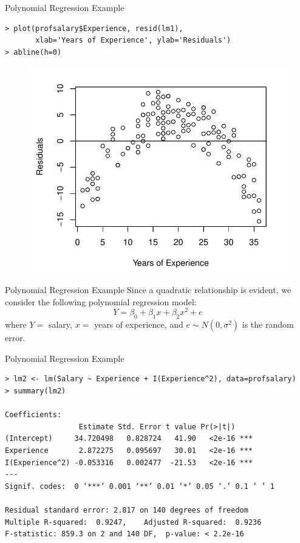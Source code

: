 \documentclass[10pt]{beamer}
\begin{document}
\begin{frame}[fragile]{Polynomial Regression Example}
\small
\begin{verbatim}
> plot(profsalary$Experience, resid(lm1), 
       xlab='Years of Experience', ylab='Residuals')
> abline(h=0)
\end{verbatim}
\begin{figure}
\includegraphics[scale=0.5]{figure/salary_resid1.pdf}
\end{figure}
\end{frame}

\begin{frame}[fragile]{Polynomial Regression Example}
Since a quadratic relationship is evident, we consider the following polynomial regression model:
$$Y = \beta_0 + \beta_1 x + \beta_2 x^2 + e$$
where $Y = $ salary, $x = $ years of experience, and $e \sim N(0, \sigma^2)$ is the random error.
\end{frame}

\begin{frame}[fragile]{Polynomial Regression Example}
\small
\begin{verbatim}
> lm2 <- lm(Salary ~ Experience + I(Experience^2), data=profsalary)
> summary(lm2)

Coefficients:
                 Estimate Std. Error t value Pr(>|t|)    
(Intercept)     34.720498   0.828724   41.90   <2e-16 ***
Experience       2.872275   0.095697   30.01   <2e-16 ***
I(Experience^2) -0.053316   0.002477  -21.53   <2e-16 ***
---
Signif. codes:  0 ‘***’ 0.001 ‘**’ 0.01 ‘*’ 0.05 ‘.’ 0.1 ‘ ’ 1

Residual standard error: 2.817 on 140 degrees of freedom
Multiple R-squared:  0.9247,	Adjusted R-squared:  0.9236 
F-statistic: 859.3 on 2 and 140 DF,  p-value: < 2.2e-16
\end{verbatim}
\end{frame}
\end{document}
